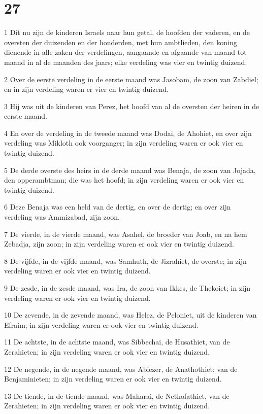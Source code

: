 \chapter{27}

\par 1 Dit nu zijn de kinderen Israels naar hun getal, de hoofden der vaderen, en de oversten der duizenden en der honderden, met hun ambtlieden, den koning dienende in alle zaken der verdelingen, aangaande en afgaande van maand tot maand in al de maanden des jaars; elke verdeling was vier en twintig duizend.
\par 2 Over de eerste verdeling in de eerste maand was Jasobam, de zoon van Zabdiel; en in zijn verdeling waren er vier en twintig duizend.
\par 3 Hij was uit de kinderen van Perez, het hoofd van al de oversten der heiren in de eerste maand.
\par 4 En over de verdeling in de tweede maand was Dodai, de Ahohiet, en over zijn verdeling was Mikloth ook voorganger; in zijn verdeling waren er ook vier en twintig duizend.
\par 5 De derde overste des heirs in de derde maand was Benaja, de zoon van Jojada, den opperambtman; die was het hoofd; in zijn verdeling waren er ook vier en twintig duizend.
\par 6 Deze Benaja was een held van de dertig, en over de dertig; en over zijn verdeling was Ammizabad, zijn zoon.
\par 7 De vierde, in de vierde maand, was Asahel, de broeder van Joab, en na hem Zebadja, zijn zoon; in zijn verdeling waren er ook vier en twintig duizend.
\par 8 De vijfde, in de vijfde maand, was Samhuth, de Jizrahiet, de overste; in zijn verdeling waren er ook vier en twintig duizend.
\par 9 De zesde, in de zesde maand, was Ira, de zoon van Ikkes, de Thekoiet; in zijn verdeling waren er ook vier en twintig duizend.
\par 10 De zevende, in de zevende maand, was Helez, de Peloniet, uit de kinderen van Efraim; in zijn verdeling waren er ook vier en twintig duizend.
\par 11 De achtste, in de achtste maand, was Sibbechai, de Husathiet, van de Zerahieten; in zijn verdeling waren er ook vier en twintig duizend.
\par 12 De negende, in de negende maand, was Abiezer, de Anathothiet; van de Benjaminieten; in zijn verdeling waren er ook vier en twintig duizend.
\par 13 De tiende, in de tiende maand, was Maharai, de Nethofathiet, van de Zerahieten; in zijn verdeling waren er ook vier en twintig duizend.
